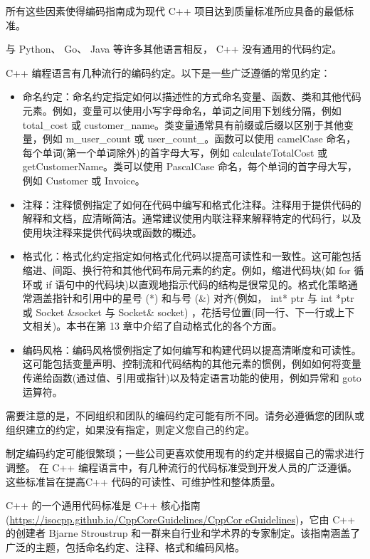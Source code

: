 所有这些因素使得编码指南成为现代 C++ 项目达到质量标准所应具备的最低标准。


与 Python、 Go、 Java 等许多其他语言相反， C++ 没有通用的代码约定。

C++ 编程语言有几种流行的编码约定。以下是一些广泛遵循的常见约定：

\begin{itemize}
\item
命名约定：命名约定指定如何以描述性的方式命名变量、函数、类和其他代码元素。例如，变量可以使用小写字母命名，单词之间用下划线分隔，例如 total\_cost 或 customer\_name。类变量通常具有前缀或后缀以区别于其他变量，例如 m\_user\_count 或 user\_count\_。函数可以使用 camelCase 命名，每个单词(第一个单词除外)的首字母大写，例如 calculateTotalCost 或 getCustomerName。类可以使用 PascalCase 命名，每个单词的首字母大写，例如 Customer 或 Invoice。

\item
注释：注释惯例指定了如何在代码中编写和格式化注释。注释用于提供代码的解释和文档，应清晰简洁。通常建议使用内联注释来解释特定的代码行，以及使用块注释来提供代码块或函数的概述。

\item
格式化：格式化约定指定如何格式化代码以提高可读性和一致性。这可能包括缩进、间距、换行符和其他代码布局元素的约定。例如，缩进代码块(如 for 循环或 if 语句中的代码块)以直观地指示代码的结构是很常见的。格式化策略通常涵盖指针和引用中的星号 (*) 和与号 (\&) 对齐(例如， int* ptr 与 int *ptr 或 Socket \&socket 与 Socket\& socket) ，花括号位置(同一行、下一行或上下文相关)。本书在第 13 章中介绍了自动格式化的各个方面。

\item
编码风格：编码风格惯例指定了如何编写和构建代码以提高清晰度和可读性。这可能包括变量声明、控制流和代码结构的其他元素的惯例，例如如何将变量传递给函数(通过值、引用或指针)以及特定语言功能的使用，例如异常和 goto 运算符。
\end{itemize}

需要注意的是，不同组织和团队的编码约定可能有所不同。请务必遵循您的团队或组织建立的约定，如果没有指定，则定义您自己的约定。

制定编码约定可能很繁琐；一些公司更喜欢使用现有的约定并根据自己的需求进行调整。
在 C++ 编程语言中，有几种流行的代码标准受到开发人员的广泛遵循。这些标准旨在提高C++ 代码的可读性、可维护性和整体质量。

C++ 的一个通用代码标准是 C++ 核心指南 (\url{https://isocpp.github.io/CppCoreGuidelines/CppCor eGuidelines})，它由 C++ 的创建者 Bjarne Stroustrup 和一群来自行业和学术界的专家制定。该指南涵盖了广泛的主题，包括命名约定、注释、格式和编码风格。

